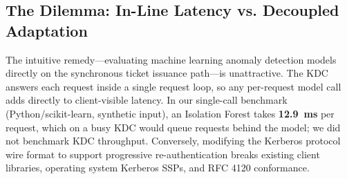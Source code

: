 \documentclass[conference]{IEEEtran}
\begin{document}
\subsection{The Dilemma: In-Line Latency vs. Decoupled Adaptation}
The intuitive remedy---evaluating machine learning anomaly detection models directly on the synchronous ticket issuance path---is unattractive. The KDC answers each request inside a single request loop, so any per-request model call adds directly to client-visible latency. In our single-call benchmark (Python/scikit-learn, synthetic input), an Isolation Forest takes \textbf{12.9~ms} per request, which on a busy KDC would queue requests behind the model; we did not benchmark KDC throughput. Conversely, modifying the Kerberos protocol wire format to support progressive re-authentication breaks existing client libraries, operating system Kerberos SSPs, and RFC 4120 conformance.
\end{document}
